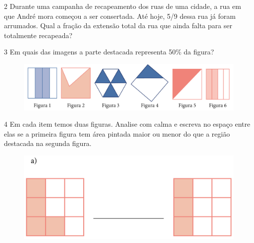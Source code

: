 \num{2} Durante uma campanha de recapeamento dos ruas de uma cidade, a rua
em que André mora começou a ser consertada. Até hoje, 5/9 dessa rua já
foram arrumados. Qual a fração da extensão total da rua que ainda falta para ser totalmente recapeada?

\bigskip
\bigskip

\num{3} Em quais das imagens a parte destacada representa 50\% da figura?

\begin{figure}[htpb!]
\includegraphics[width=\textwidth]{../ilustracoes/MAT5/SAEB_5ANO_MAT_figura68.png}
\end{figure}



\pagebreak
\num{4} Em cada item temos duas figuras. Analise com calma e escreva no
espaço entre elas se a primeira figura tem área pintada maior ou menor
do que a região destacada na segunda figura.

\begin{figure}[htpb!]
\centering
\includegraphics[width=.8\textwidth]{../ilustracoes/MAT5/SAEB_5ANO_MAT_figura69-1.png}
\end{figure}



